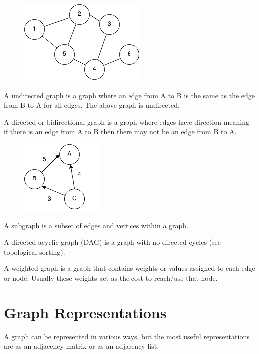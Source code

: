 \documentclass[11pt,oneside]{book}
\makeatletter
\def\maxwidth#1{\ifdim\Gin@nat@width>#1 #1\else\Gin@nat@width\fi}
\makeatother
\begin{document}
\vspace{5px}\begin{figure}[H]\centering
        \includegraphics[width=0.66\maxwidth{\textwidth}]{graph.png}
        \end{figure}

A undirected graph is a graph where an edge from A to B is the same as the edge from B to A for all edges. The above graph is undirected.

A directed or bidirectional graph is a graph where edges have direction meaning if there is an edge from A to B then there may not be an edge from B to A.

\vspace{5px}\begin{figure}[H]\centering
        \includegraphics[width=0.66\maxwidth{\textwidth}]{digraph.png}
        \end{figure}

A subgraph is a subset of edges and vertices within a graph.

A directed acyclic graph (DAG) is a graph with no directed cycles (see topological sorting).

A weighted graph is a graph that contains weights or values assigned to each edge or node. Usually these weights act as the cost to reach/use that node.


    \chapter{ Graph Representations }
        

A graph can be represented in various ways, but the most useful representations are as an adjacency matrix or as an adjacency list.
\end{document}
